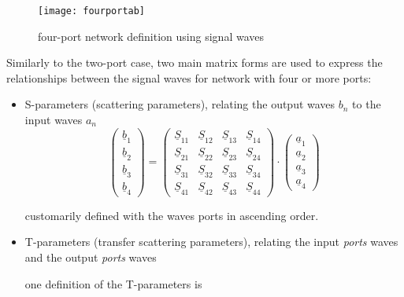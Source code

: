 \begin{figure}[ht]
\begin{center}
\texttt{[image: fourportab]}
\end{center}
\caption{four-port network definition using signal waves}
\label{fig:fourportab}
\end{figure}
\FloatBarrier

Similarly to the two-port case, two main matrix forms are used to express the relationships between the signal waves for network with four or more ports:

\begin{itemize}

\item S-parameters (scattering parameters), relating the output waves ${b}_{n}$ to the input waves ${a}_{n}$
\begin{equation}
\label{eq:sparam4def}
\begin{pmatrix}
\underline{b}_{1}\\
\underline{b}_{2}\\
\underline{b}_{3}\\
\underline{b}_{4}
\end{pmatrix}
=
\begin{pmatrix}
\underline{S}_{11} & \underline{S}_{12} & \underline{S}_{13} & \underline{S}_{14}\\
\underline{S}_{21} & \underline{S}_{22} & \underline{S}_{23} & \underline{S}_{24}\\
\underline{S}_{31} & \underline{S}_{32} & \underline{S}_{33} & \underline{S}_{34}\\
\underline{S}_{41} & \underline{S}_{42} & \underline{S}_{43} & \underline{S}_{44}
\end{pmatrix}
\cdot
\begin{pmatrix}
\underline{a}_{1}\\
\underline{a}_{2}\\
\underline{a}_{3}\\
\underline{a}_{4}
\end{pmatrix}
\end{equation}

customarily defined with the waves ports in ascending order.

\item T-parameters (transfer scattering parameters), relating the input \textit{ports} waves and the output \textit{ports} waves

one definition of the T-parameters is


\end{itemize}
